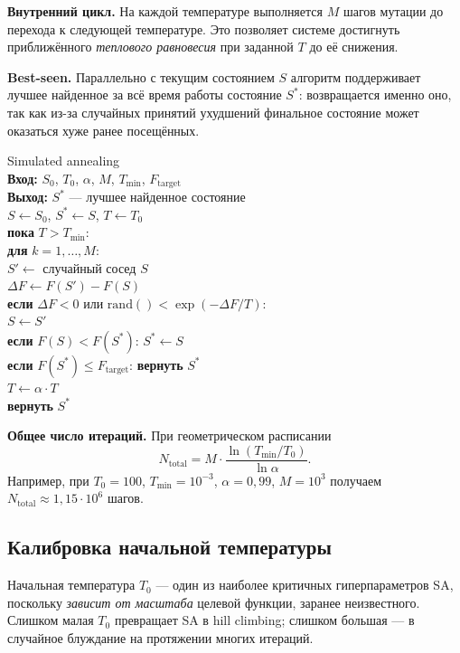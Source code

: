 \textbf{Внутренний цикл.} На каждой температуре выполняется $M$
шагов мутации до перехода к следующей температуре. Это позволяет
системе достигнуть приближённого \emph{теплового равновесия}
при заданной $T$ до её снижения.

\textbf{Best-seen.} Параллельно с текущим состоянием $S$ алгоритм
поддерживает лучшее найденное за всё время работы состояние
$S^*$: возвращается именно оно, так как из-за случайных
принятий ухудшений финальное состояние может оказаться хуже
ранее посещённых.

\begin{algorithm}{Simulated annealing}\hfill\\
\textbf{Вход:} $S_0$, $T_0$, $\alpha$, $M$, $T_{\min}$, $F_{\mathrm{target}}$ \\
\textbf{Выход:} $S^*$ --- лучшее найденное состояние \\[2pt]
$S \leftarrow S_0$, $S^* \leftarrow S$, $T \leftarrow T_0$ \\
\textbf{пока} $T > T_{\min}$: \\
\quad \textbf{для} $k = 1, \dots, M$: \\
\quad\quad $S' \leftarrow$ случайный сосед $S$ \\
\quad\quad $\Delta F \leftarrow F(S') - F(S)$ \\
\quad\quad \textbf{если} $\Delta F < 0$ или $\mathrm{rand}() < \exp(-\Delta F / T)$: \\
\quad\quad\quad $S \leftarrow S'$ \\
\quad\quad\quad \textbf{если} $F(S) < F(S^*)$: $S^* \leftarrow S$ \\
\quad\quad\quad \textbf{если} $F(S^*) \leq F_{\mathrm{target}}$: \textbf{вернуть} $S^*$ \\
\quad $T \leftarrow \alpha \cdot T$ \\
\textbf{вернуть} $S^*$
\end{algorithm}

\textbf{Общее число итераций.} При геометрическом расписании
\[
    N_{\mathrm{total}} = M \cdot \frac{\ln(T_{\min}/T_0)}{\ln \alpha}.
\]
Например, при $T_0 = 100$, $T_{\min} = 10^{-3}$, $\alpha = 0{,}99$,
$M = 10^3$ получаем $N_{\mathrm{total}} \approx 1{,}15 \cdot 10^6$ шагов.

\subsection{Калибровка начальной температуры}

Начальная температура $T_0$ — один из наиболее критичных
гиперпараметров SA, поскольку \emph{зависит от масштаба} целевой
функции, заранее неизвестного. Слишком малая $T_0$ превращает SA
в hill climbing; слишком большая — в случайное блуждание на
протяжении многих итераций.

